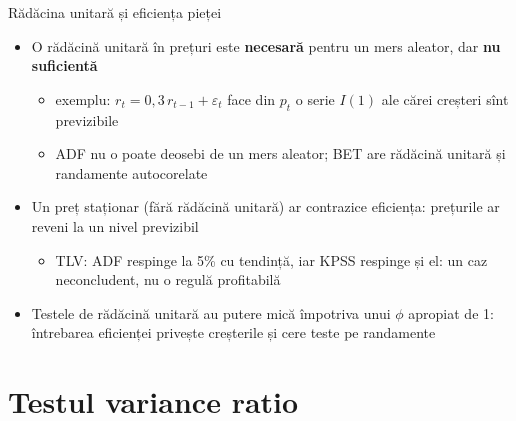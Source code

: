 \begin{frame}{Rădăcina unitară și eficiența pieței}
\itemsize{\small}
\begin{itemize}
    \item O rădăcină unitară în prețuri este \textbf{necesară} pentru un mers aleator, dar \textbf{nu suficientă}
    \begin{itemize}
        \item exemplu: $r_t = 0{,}3\,r_{t-1} + \varepsilon_t$ face din $p_t$ o serie $I(1)$ ale cărei creșteri sînt previzibile
        \item ADF nu o poate deosebi de un mers aleator; BET are rădăcină unitară și randamente autocorelate
    \end{itemize}
    \item Un preț staționar (fără rădăcină unitară) ar contrazice eficiența: prețurile ar reveni la un nivel previzibil
    \begin{itemize}
        \item TLV: ADF respinge la 5\% cu tendință, iar KPSS respinge și el: un caz neconcludent, nu o regulă profitabilă
    \end{itemize}
    \item Testele de rădăcină unitară au putere mică împotriva unui $\phi$ apropiat de 1: întrebarea eficienței privește creșterile și cere teste pe randamente
\end{itemize}
\end{frame}


\section{Testul variance ratio}

